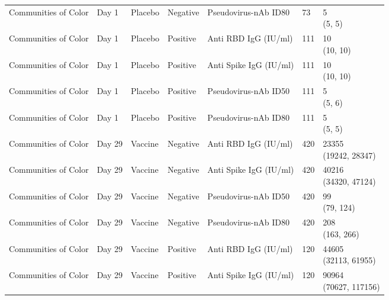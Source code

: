 \documentclass[]{book}
\theoremstyle{definition}
\theoremstyle{definition}
\theoremstyle{definition}
\newcommand{\1}{\mathbbm{1}}
\begin{document}
\begin{landscape}
\begin{ThreePartTable}
\begin{longtable}[t]{>{\raggedright\arraybackslash}p{7cm}llllll}
\hspace{1em}Communities of Color & Day 1 & Placebo & Negative & Pseudovirus-nAb ID80 & 73 & \makecell[l]{5\\(5, 5)}\\
\hspace{1em}Communities of Color & Day 1 & Placebo & Positive & Anti RBD IgG (IU/ml) & 111 & \makecell[l]{10\\(10, 10)}\\
\hspace{1em}Communities of Color & Day 1 & Placebo & Positive & Anti Spike IgG (IU/ml) & 111 & \makecell[l]{10\\(10, 10)}\\
\hspace{1em}Communities of Color & Day 1 & Placebo & Positive & Pseudovirus-nAb ID50 & 111 & \makecell[l]{5\\(5, 6)}\\
\hspace{1em}Communities of Color & Day 1 & Placebo & Positive & Pseudovirus-nAb ID80 & 111 & \makecell[l]{5\\(5, 5)}\\
\hspace{1em}Communities of Color & Day 29 & Vaccine & Negative & Anti RBD IgG (IU/ml) & 420 & \makecell[l]{23355\\(19242, 28347)}\\
\hspace{1em}Communities of Color & Day 29 & Vaccine & Negative & Anti Spike IgG (IU/ml) & 420 & \makecell[l]{40216\\(34320, 47124)}\\
\hspace{1em}Communities of Color & Day 29 & Vaccine & Negative & Pseudovirus-nAb ID50 & 420 & \makecell[l]{99\\(79, 124)}\\
\hspace{1em}Communities of Color & Day 29 & Vaccine & Negative & Pseudovirus-nAb ID80 & 420 & \makecell[l]{208\\(163, 266)}\\
\hspace{1em}Communities of Color & Day 29 & Vaccine & Positive & Anti RBD IgG (IU/ml) & 120 & \makecell[l]{44605\\(32113, 61955)}\\
\hspace{1em}Communities of Color & Day 29 & Vaccine & Positive & Anti Spike IgG (IU/ml) & 120 & \makecell[l]{90964\\(70627, 117156)}\\

\end{longtable}
\end{ThreePartTable}
\end{landscape}
\end{document}
